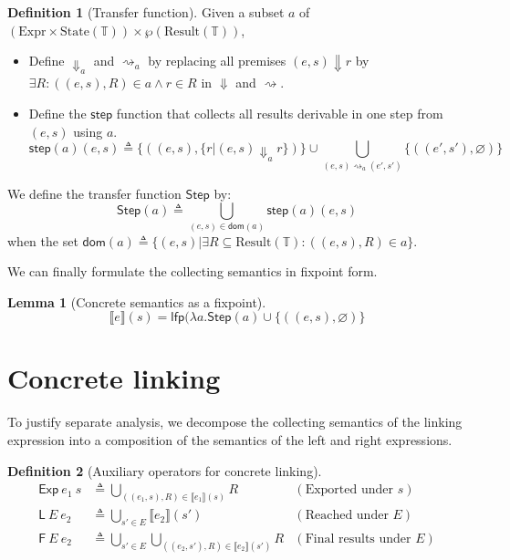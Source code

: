 \documentclass[acmsmall,screen,review]{acmart}
\theoremstyle{definition}
\newtheorem{definition}{Definition}[section]
\newtheorem{lem}{Lemma}[section]
\newcommand*{\Expr}{\text{Expr}}
\newcommand*{\Time}{\mathbb{T}}
\newcommand*{\Config}[1]{\text{State}({#1})}
\newcommand*{\Result}[1]{\text{Result}({#1})}
\newcommand*{\EE}{\mathsf{Exp}}
\newcommand*{\LL}{\mathsf{L}}
\newcommand*{\sembracket}[1]{\lBrack{#1}\rBrack}
\begin{document}
\begin{definition}[Transfer function]
  Given a subset $a$ of $(\Expr\times\Config{\Time})\times{\wp(\Result{\Time})}$,

  \begin{itemize}
    \item Define ${\Downarrow}_{a}$ and ${\rightsquigarrow}_{a}$ by replacing all premises $(e,s)\Downarrow r$ by $\exists R:((e,s),R)\in a\wedge r\in R$ in $\Downarrow$ and $\rightsquigarrow$.
    \item Define the ${\mathsf{step}}$ function that collects all results derivable in one step from $(e,s)$ using $a$.
          \[
            \mathsf{step}(a)(e,s)\triangleq
            \{((e,s),\{r|(e,s){\Downarrow}_{a}r\})\}
            \cup
            \bigcup_{(e,s)\rightsquigarrow_{a}(e',s')}\{((e',s'),\varnothing)\}
          \]
  \end{itemize}

  We define the transfer function $\mathsf{Step}$ by:
  \[
    \mathsf{Step}(a)\triangleq
    \bigcup_{(e,s)\in\mathsf{dom}(a)}
    {\mathsf{step}(a)(e,s)}
  \]
  when the set $\mathsf{dom}(a)\triangleq\{(e,s)|\exists R\subseteq\Result{\Time}:((e,s),R)\in a\}$.
\end{definition}

We can finally formulate the collecting semantics in fixpoint form.
\begin{lem}[Concrete semantics as a fixpoint]
  \[
    \sembracket{e}(s)=\mathsf{lfp}(\lambda a.\mathsf{Step}(a)\cup\{((e,s),\varnothing)\}
  \]
\end{lem}

\section{Concrete linking}
To justify separate analysis, we decompose the collecting semantics of the linking expression into a composition of the semantics of the left and right expressions.

\begin{definition}[Auxiliary operators for concrete linking]
  \begin{align*}
    \EE\:e_1\:s        & \triangleq\bigcup_{((e_1,s),R)\in\sembracket{e_1}(s)}R                      & (\text{Exported under }s)      \\
    \LL\:E\:e_2        & \triangleq\bigcup_{s'\in E}\sembracket{e_2}(s')                             & (\text{Reached under }E)       \\
    \mathsf{F}\:E\:e_2 & \triangleq\bigcup_{s'\in E}\bigcup_{((e_2,s'),R)\in\sembracket{e_2}(s')}{R} & (\text{Final results under }E)
  \end{align*}
\end{definition}
\end{document}
